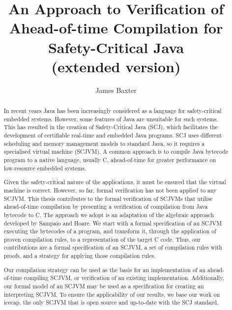 \documentclass[a4paper,11pt]{report}
\title{An Approach to Verification of Ahead-of-time Compilation for
  Safety-Critical Java\\
  (extended version)}
\author{James Baxter}
\date{}
\begin{document}
\maketitle


\begin{abstract}
  In recent years Java has been increasingly considered as a language
  for safety-critical embedded systems.
  However, some features of Java are unsuitable for such systems.
  This has resulted in the creation of Safety-Critical Java (SCJ),
  which facilitates the development of certifiable real-time and
  embedded Java programs.
  SCJ uses different scheduling and memory management models to
  standard Java, so it requires a specialised virtual machine (SCJVM).
  A common approach is to compile Java bytecode program to a native
  language, usually C, ahead-of-time for greater performance on
  low-resource embedded systems.
  
  Given the safety-critical nature of the applications, it must be
  ensured that the virtual machine is correct.
  However, so far, formal verification has not been applied to any
  SCJVM.
  This thesis contributes to the formal verification of SCJVMs that
  utilise ahead-of-time compilation by presenting a verification of
  compilation from Java bytecode to C.
  The approach we adopt is an adaptation of the algebraic approach
  developed by Sampaio and Hoare.
  We start with a formal specification of an SCJVM executing the
  bytecodes of a program, and transform it, through the application
  of proven compilation rules, to a representation of the target C
  code.
  Thus, our contributions are a formal specification of an SCJVM, a
  set of compilation rules with proofs, and a strategy for applying
  those compilation rules.
  
  Our compilation strategy can be used as the basis for an
  implementation of an ahead-of-time compiling SCJVM, or verification
  of an existing implementation.
  Additionally, our formal model of an SCJVM may be used as a
  specification for creating an interpreting SCJVM.
  To ensure the applicability of our results, we base our work on
  icecap, the only SCJVM that is open source and up-to-date with the
  SCJ standard.
\end{abstract}

\tableofcontents

\cleardoublepage
{}
{}
\listoftables

\cleardoublepage
{}
{}
\listoffigures
\end{document}

